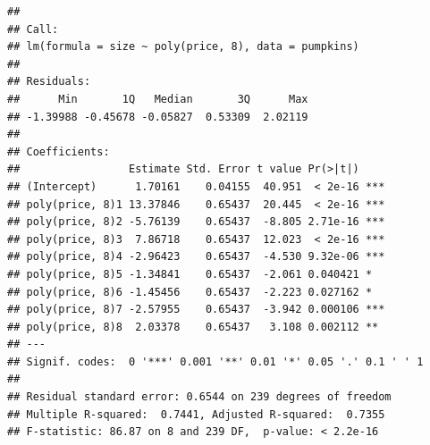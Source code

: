 \documentclass[
]{book}
\begin{document}
\begin{verbatim}
## 
## Call:
## lm(formula = size ~ poly(price, 8), data = pumpkins)
## 
## Residuals:
##      Min       1Q   Median       3Q      Max 
## -1.39988 -0.45678 -0.05827  0.53309  2.02119 
## 
## Coefficients:
##                 Estimate Std. Error t value Pr(>|t|)    
## (Intercept)      1.70161    0.04155  40.951  < 2e-16 ***
## poly(price, 8)1 13.37846    0.65437  20.445  < 2e-16 ***
## poly(price, 8)2 -5.76139    0.65437  -8.805 2.71e-16 ***
## poly(price, 8)3  7.86718    0.65437  12.023  < 2e-16 ***
## poly(price, 8)4 -2.96423    0.65437  -4.530 9.32e-06 ***
## poly(price, 8)5 -1.34841    0.65437  -2.061 0.040421 *  
## poly(price, 8)6 -1.45456    0.65437  -2.223 0.027162 *  
## poly(price, 8)7 -2.57955    0.65437  -3.942 0.000106 ***
## poly(price, 8)8  2.03378    0.65437   3.108 0.002112 ** 
## ---
## Signif. codes:  0 '***' 0.001 '**' 0.01 '*' 0.05 '.' 0.1 ' ' 1
## 
## Residual standard error: 0.6544 on 239 degrees of freedom
## Multiple R-squared:  0.7441, Adjusted R-squared:  0.7355 
## F-statistic: 86.87 on 8 and 239 DF,  p-value: < 2.2e-16
\end{verbatim}
\end{document}
